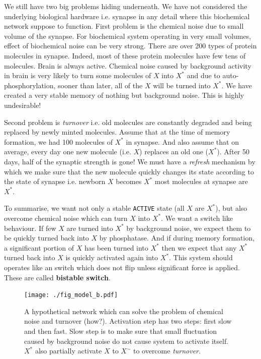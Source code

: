 \documentclass[]{resonance}
\begin{document}
We still have two big problems hiding underneath. We have not considered the
underlying biological hardware i.e. synapse in any detail where this biochemical
network suppose to function. First problem is the chemical noise due to small
volume of the synapse. For biochemical system operating in very small volumes,
effect of biochemical noise can be very strong.  There are over 200 types of
protein molecules in synapse. Indeed, most of these protein molecules have few
tens of molecules.  Brain is always active. Chemical noise caused by background
activity in brain is very likely to turn some molecules of $X$ into $X^*$ and
due to auto-phosphorylation, sooner than later, all of the $X$ will be turned
into $X^*$. We have created a very stable memory of nothing but background
noise. This is highly undesirable!

Second problem is \textit{turnover} i.e. old molecules are constantly degraded
and being replaced by newly minted molecules. Assume that at the time of memory
formation, we had 100 molecules of $X^*$ in synapse. And also assume that on
average, every day one new molecule (i.e. $X$) replaces an old one ($X^*$).
After 50 days, half of the synaptic strength is gone! We must have a
\textit{refresh} mechanism by which we make sure that the new molecule quickly
changes its state according to the state of synapse i.e. newborn $X$ becomes
$X^*$ most molecules at synapse are $X^*$.

To summarise, we want not only a stable \texttt{ACTIVE} state (all $X$ are
$X^*$), but also overcome chemical noise which can turn $X$ into $X^*$. We want
a switch like behaviour. If few $X$ are turned into $X^*$ by background noise,
we expect them to be quickly turned back into $X$ by phosphatase. And if during
memory formation, a significant portion of $X$ has been turned into $X^*$ then
we expect that any $X^*$ turned back into $X$ is quickly activated again into
$X^*$.  This system should operates like an switch which does not flip unless
significant force is applied. These are called \textbf{bistable switch}. 

\begin{figure}[b!]
\caption{A hypothetical network which can solve the problem of chemical noise and
    turnover (how?). Activation step has two steps: first slow and then fast. 
    Slow step is to make sure that small fluctuation caused by background noise do not 
    cause system to activate itself. $X^*$ also partially activate $X$ to
    $X^\sim$ to overcome \textit{turnover}.
}\label{fig:model_bistable}
\centering
\texttt{[image: ./fig\_model\_b.pdf]}
\end{figure}
\end{document}

